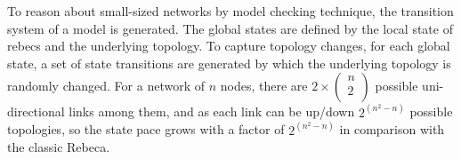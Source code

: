 To reason about small-sized networks by model checking technique, the transition system of a model is generated. The global states %
are defined by the local state of rebecs and the underlying topology. %
To capture topology changes, for each global state, a set of state transitions are generated by which the underlying topology is randomly changed.  For a network of $n$ nodes, there are $2\times \begin{pmatrix}
n \\
2 \\
\end{pmatrix}$ possible uni-directional links among them, and as each link can be up/down $2^{(n^2-n)}$ possible topologies, %
so the state pace grows with a factor of $2^{(n^2-n)}$ in comparison with the classic Rebeca. 

